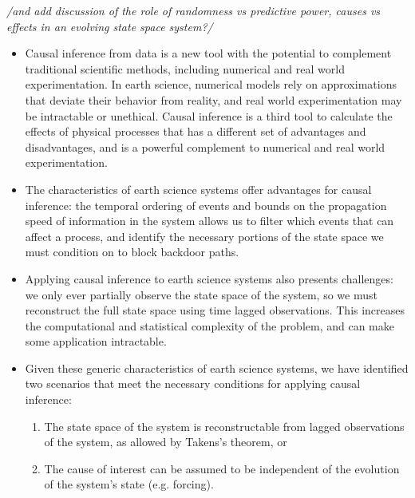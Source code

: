 \documentclass[12pt]{article}
\begin{document}
\emph{/and add discussion of the role of randomness vs predictive
  power, causes vs effects in an evolving state space system?/}

\begin{itemize}
\item Causal inference from data is a new tool with the potential to
  complement traditional scientific methods, including numerical and
  real world experimentation. In earth science, numerical models rely
  on approximations that deviate their behavior from reality, and real
  world experimentation may be intractable or unethical. Causal
  inference is a third tool to calculate the effects of physical
  processes that has a different set of advantages and
  disadvantages, and is a powerful complement to numerical and real
  world experimentation.
\item The characteristics of earth science systems offer advantages
  for causal inference: the temporal ordering of events and bounds on
  the propagation speed of information in the system allows us to
  filter which events that can affect a process, and identify the
  necessary portions of the state space we must condition on to block
  backdoor paths.
\item Applying causal inference to earth science systems also presents
  challenges: we only ever partially observe the state space of the
  system, so we must reconstruct the full state space using time
  lagged observations. This increases the computational and
  statistical complexity of the problem, and can make some application
  intractable.
\item Given these generic characteristics of earth science systems, we
  have identified two scenarios that meet the necessary conditions for
  applying causal inference:
  \begin{enumerate}
  \item The state space of the system is reconstructable
    from lagged observations of the system, as allowed by
    Takens's theorem, or
  \item The cause of interest can be assumed to be
    independent of the evolution of the system's state
    (e.g. forcing).
  \end{enumerate}
\end{itemize}





\end{document}
